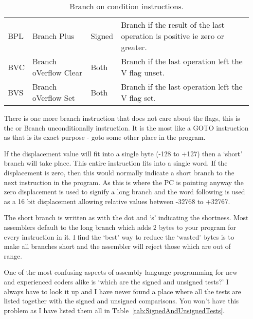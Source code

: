 \begin{table}[htbp]
\begin{tabular}{l l l p{}}
BPL & Branch Plus             & Signed   & Branch if the result of the last operation is positive ie zero or greater.\\
BVC & Branch oVerflow Clear   & Both     & Branch if the last operation left the V flag unset.\\
BVS & Branch oVerflow Set     & Both     & Branch if the last operation left the V flag set.\\
\bottomrule
\end{tabular}
\caption{Branch on condition instructions.}
\label{tab:BranchOnConditionInstructions}
\end{table}

There is one more branch instruction that does not care about the
    flags, this is the  or Branch unconditionally instruction. It is the
    most like a GOTO instruction as that is its exact purpose -{} goto some
    other place in the program.

If the displacement value will fit into a single byte (-{}128 to +127)
    then a `short' branch will take place. This entire instruction fits into a
    single word. If the displacement is zero, then this would normally
    indicate a short branch to the next instruction in the program. As this is
    where the PC is pointing anyway the zero displacement is used to signify a
    long branch and the word following is used as a 16 bit displacement
    allowing relative values between -{}32768 to +32767.

The short branch is written as  with the dot and `s' indicating
    the shortness. Most assemblers default to the long branch which adds 2
    bytes to your program for every  instruction in it. I find the `best'
    way to reduce the `wasted' bytes is to make all branches short and the
    assembler will reject those which are out of range.

One of the most confusing aspects of assembly language programming
    for new and experienced coders alike is `which are the signed and unsigned
    tests?' I always have to look it up and I have never found a place where
    all the tests are listed together with the signed and unsigned
    comparisons. You won't have this problem as I have listed them all in Table~\ref{tab:SignedAndUnsignedTests}.

